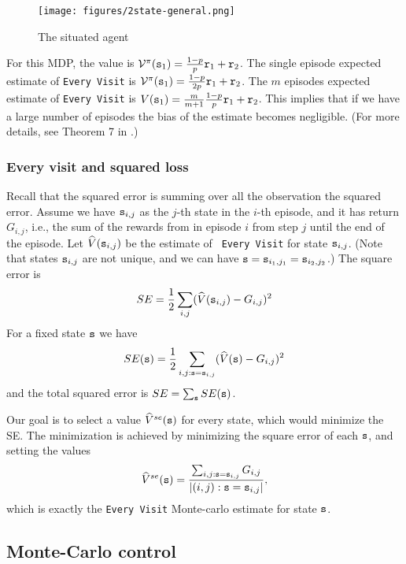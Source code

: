\begin{advanced}
\begin{figure}
  \begin{centering}
  \texttt{[image: figures/2state-general.png]}\\
  \caption{The situated agent}\label{fig:2state-general}
  \end{centering}
\end{figure}


For this MDP, the value is
$\mathcal{V}^\pi({\tt s}_1)=\frac{1-p}{p}{\tt r}_1+{\tt r}_2$. The single
episode expected estimate of {\tt Every Visit} is
$\mathcal{V}^\pi({\tt s}_1)=\frac{1-p}{2p}{\tt r}_1+{\tt r}_2$. The $m$
episodes expected estimate of {\tt Every Visit} is
$V({\tt s}_1)=\frac{m}{m+1}\frac{1-p}{p}{\tt r}_1+{\tt r}_2$. This
implies that if we have a large number of episodes the bias of the
estimate becomes negligible. (For more details, see Theorem 7 in
\cite{SinghS96}.)


\subsubsection*{Every visit and squared loss}

Recall that the squared error is summing over all the observation
the squared error. Assume we have ${\tt s}_{i,j}$ as the $j$-th state
in the $i$-th episode, and it has return $G_{i,j}$, i.e., the sum of
the rewards from in episode $i$ from step $j$ until the end of the
episode. Let $\widehat{V}({\tt s}_{i,j})$ be the estimate of {\tt
Every Visit} for state ${\tt s}_{i,j}$. (Note that states
${\tt s}_{i,j}$ are not unique, and we can have
${\tt s}={\tt s}_{i_1,j_1}={\tt s}_{i_2,j_2}$.) The square error is
\[
SE=\frac{1}{2}\sum_{i,j} (\widehat{V}({\tt s}_{i,j})-G_{i,j})^2
\]
For a fixed state ${\tt s}$ we have
\[
SE({\tt s})=\frac{1}{2}\sum_{i,j:{\tt s}={\tt s}_{i,j}}
(\widehat{V}({\tt s})-G_{i,j})^2
\]
and the total squared error is $SE=\sum_{\tt s} SE({\tt s})$.

Our goal is to select a value $\widehat{V}^{se}({\tt s})$ for every
state, which would minimize the SE. The minimization is achieved by
minimizing the square error of each ${\tt s}$, and setting the values
\[
\widehat{V}^{se}({\tt s})=\frac{\sum_{i,j:{\tt s}={\tt s}_{i,j}}
G_{i,j}}{|{(i,j):{\tt s}={\tt s}_{i,j}}|},
\]
which is exactly the {\tt Every Visit} Monte-carlo estimate for
state ${\tt s}$.
\end{advanced}

\subsection{Monte-Carlo control}

